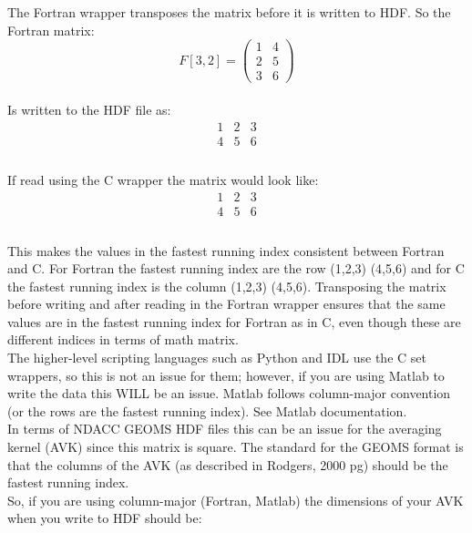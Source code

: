 \documentclass[12pt, letterpaper]{article}
\begin{document}
The Fortran wrapper transposes the matrix before it is written to HDF. So the Fortran matrix:\\
\[
F[3,2] =
\begin{pmatrix}
1 & 4 \\
2 & 5 \\
3 & 6
\end{pmatrix}
\] 
\\

Is written to the HDF file as:\\
\[
\begin{matrix}
1 & 2 & 3 \\
4 & 5 & 6 \\
\end{matrix}
\] 
\\

If read using the C wrapper the matrix would look like:\\
\[
\begin{matrix}
1 & 2 & 3 \\
4 & 5 & 6 \\
\end{matrix}
\] 
\\

This makes the values in the fastest running index consistent between Fortran and C. For Fortran the fastest running index are the row (1,2,3) (4,5,6) and for C the fastest running index is the column (1,2,3) (4,5,6). Transposing the matrix before writing and after reading in the Fortran wrapper ensures that the same values are in the fastest running index for Fortran as in C, even though these are different indices in terms of math matrix.\\

The higher-level scripting languages such as Python and IDL use the C set  wrappers, so this is not an issue for them; however, if you are using Matlab to write the data this WILL be an issue. Matlab follows column-major convention (or the rows are the fastest running index). See Matlab documentation.\\

In terms of NDACC GEOMS HDF files this can be an issue for the averaging kernel (AVK) since this matrix is square. The standard for the GEOMS format is that the columns of the AVK  (as described in Rodgers, 2000 pg) should be the fastest running index.\\

So, if you are using column-major (Fortran, Matlab) the dimensions of your AVK when you write to HDF should be:\\
\end{document}
